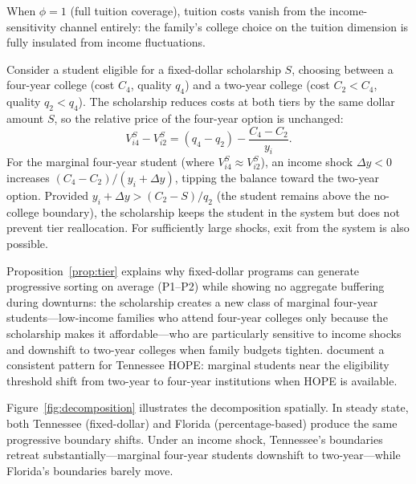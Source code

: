 \noindent When $\phi = 1$ (full tuition coverage), tuition costs
vanish from the income-sensitivity channel entirely: the family's
college choice on the tuition dimension is fully insulated from income
fluctuations.

\begin{proposition}
\label{prop:tier}
Consider a student eligible for a fixed-dollar scholarship $S$,
choosing between a four-year college (cost $C_4$, quality $q_4$) and
a two-year college (cost $C_2 < C_4$, quality $q_2 < q_4$). The
scholarship reduces costs at both tiers by the same dollar amount $S$,
so the relative price of the four-year option is unchanged:
\begin{equation}
  V_{i4}^S - V_{i2}^S
  = (q_4 - q_2) - \frac{C_4 - C_2}{y_i}.
\end{equation}
For the marginal four-year student (where $V_{i4}^S \approx V_{i2}^S$),
an income shock $\Delta y < 0$ increases $(C_4 - C_2)/(y_i + \Delta y)$,
tipping the balance toward the two-year option. Provided
$y_i + \Delta y > (C_2 - S)/q_2$ (the student remains above the
no-college boundary), the scholarship keeps the student in the system
but does not prevent tier reallocation. For sufficiently large shocks,
exit from the system is also possible.
\end{proposition}

\noindent Proposition~\ref{prop:tier} explains why fixed-dollar
programs can generate progressive sorting on average (P1--P2) while
showing no aggregate buffering during downturns: the scholarship
creates a new class of marginal four-year students---low-income
families who attend four-year colleges only because the scholarship
makes it affordable---who are particularly sensitive to income shocks
and downshift to two-year colleges when family budgets tighten.
\textcite{bruce2014jackpot} document a consistent pattern for
Tennessee HOPE: marginal students near the eligibility threshold
shift from two-year to four-year institutions when HOPE is available.

Figure~\ref{fig:decomposition} illustrates the decomposition
spatially. In steady state, both Tennessee (fixed-dollar) and Florida
(percentage-based) produce the same progressive boundary shifts. Under
an income shock, Tennessee's boundaries retreat substantially---marginal
four-year students downshift to two-year---while Florida's boundaries
barely move.



